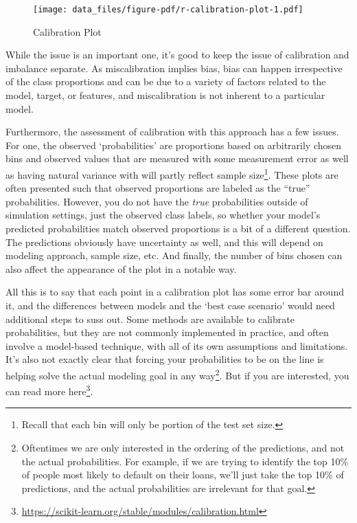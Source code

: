 \documentclass[
  letterpaper,
]{krantz}
\DeclareRobustCommand{\href}[2]{#2\footnote{\url{#1}}}
\begin{document}
\begin{figure}

{\centering \texttt{[image: data\_files/figure-pdf/r-calibration-plot-1.pdf]}

}

\caption{Calibration Plot}

\end{figure}

While the issue is an important one, it's good to keep the issue of
calibration and imbalance separate. As miscalibration implies bias, bias
can happen irrespective of the class proportions and can be due to a
variety of factors related to the model, target, or features, and
miscalibration is not inherent to a particular model.

Furthermore, the assessment of calibration with this approach has a few
issues. For one, the observed `probabilities' are proportions based on
arbitrarily chosen bins and observed values that are measured with some
measurement error as well as having natural variance with will partly
reflect sample size\footnote{Recall that each bin will only be portion
  of the test set size.}. These plots are often presented such that
observed proportions are labeled as the ``true'' probabilities. However,
you do not have the \emph{true} probabilities outside of simulation
settings, just the observed class labels, so whether your model's
predicted probabilities match observed proportions is a bit of a
different question. The predictions obviously have uncertainty as well,
and this will depend on modeling approach, sample size, etc. And
finally, the number of bins chosen can also affect the appearance of the
plot in a notable way.

All this is to say that each point in a calibration plot has some error
bar around it, and the differences between models and the `best case
scenario' would need additional steps to suss out. Some methods are
available to calibrate probabilities, but they are not commonly
implemented in practice, and often involve a model-based technique, with
all of its own assumptions and limitations. It's also not exactly clear
that forcing your probabilities to be on the line is helping solve the
actual modeling goal in any way\footnote{Oftentimes we are only
  interested in the ordering of the predictions, and not the actual
  probabilities. For example, if we are trying to identify the top 10\%
  of people most likely to default on their loans, we'll just take the
  top 10\% of predictions, and the actual probabilities are irrelevant
  for that goal.}. But if you are interested, you can read more
\href{https://scikit-learn.org/stable/modules/calibration.html}{here}.
\end{document}
